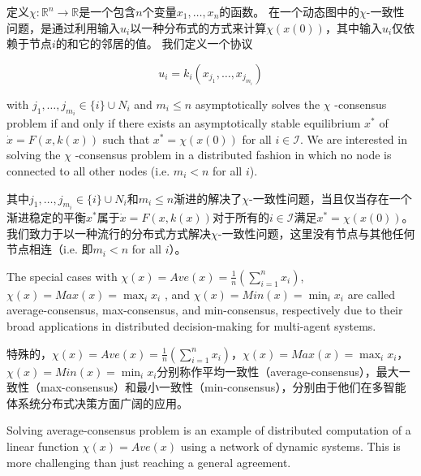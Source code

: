 \documentclass{article}
\begin{document}
定义$\chi: \mathbb{R}^n \rightarrow \mathbb{R}$是一个包含$n$个变量$x_1,\dots,x_n$的函数。
在一个动态图中的$\chi$-一致性问题，是通过利用输入$u_i$以一种分布式的方式来计算$\chi(x(0))$，其中输入$u_i$仅依赖于节点$i$的和它的邻居的值。
我们定义一个协议

\begin{equation}
    u_i = k_i(x_{j_1},\dots,x_{j_{m_i}})
    \tag{3}
    \label{3}
\end{equation}

{\color[gray]{0.5}
\noindent with $j_1,\dots,j_{m_i}\in \{i\} \cup N_i$ and $m_i\leq n$ asymptotically solves the $\chi$ -consensus problem if and only if there exists an asymptotically stable equilibrium $x^*$ of $\dot{x}=F(x,k(x))$ such that $x^*=\chi(x(0))$ for all $i\in \mathcal{I}$. 
We are interested in solving the $\chi$ -consensus problem in a distributed fashion in which no node is connected to all other nodes (i.e. $m_i < n$ for all $i$).
}

\noindent 其中$j_1,\dots,j_{m_i}\in \{i\} \cup N_i$和$m_i\leq n$渐进的解决了$\chi$-一致性问题，当且仅当存在一个渐进稳定的平衡$x^*$属于$\dot{x}=F(x,k(x))$对于所有的$i\in \mathcal{I}$满足$x^*=\chi(x(0))$。
我们致力于以一种流行的分布式方式解决$\chi$-一致性问题，这里没有节点与其他任何节点相连（i.e. 即$m_i < n$ for all $i$）。

{\color[gray]{0.5}
The special cases with $\chi(x)=Ave(x)=\frac{1}{n}(\sum_{i=1}^{n}x_i)$, $\chi(x)=Max(x)=\max_ix_i$ , and $\chi(x)=Min(x)=\min_ix_i$ are called average-consensus, max-consensus, and min-consensus, respectively due to their broad applications in distributed decision-making for multi-agent systems.
}

特殊的，$\chi(x)=Ave(x)=\frac{1}{n}(\sum_{i=1}^{n}x_i)$，$\chi(x)=Max(x)=\max_ix_i$，$\chi(x)=Min(x)=\min_ix_i$分别称作平均一致性（average-consensus），最大一致性（max-consensus）和最小一致性（min-consensus），分别由于他们在多智能体系统分布式决策方面广阔的应用。



{\color[gray]{0.5}
Solving average-consensus problem is an example of distributed computation of a linear function $\chi(x)=Ave(x)$ using a network of dynamic systems. 
This is more challenging than just reaching a general agreement.
}
\end{document}

